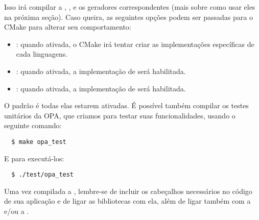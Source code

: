 Isso irá compilar a , ,  e 
os geradores correspondentes (mais sobre como usar eles na próxima seção). Caso queira, as
seguintes opções podem ser passadas para o CMake para alterar seu comportamento:

\begin{itemize}
  \item {}: quando ativada, o CMake irá tentar criar as 
    implementações específicas de cada linguagens.
  \item {}: quando ativada, a implementação de  será 
    habilitada.
  \item {}: quando ativada, a implementação de 
    será habilitada.
\end{itemize}

O padrão é todas elas estarem ativadas. É possível também compilar os testes unitários da
OPA, que criamos para testar suas funcionalidades, usando o seguinte comando:

\begin{verbatim}
  $ make opa_test
\end{verbatim}

E para executá-los:

\begin{verbatim}
  $ ./test/opa_test
\end{verbatim}

Uma vez compilada a , lembre-se de incluir os cabeçalhos necessários
no código de sua aplicação e de ligar as bibliotecas com ela, além de ligar também
com a  e/ou a .
    
